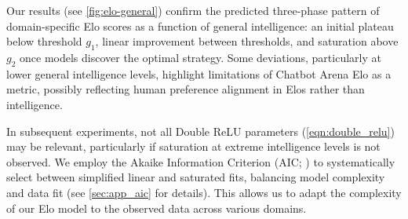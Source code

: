 \documentclass{article}
\begin{document}
Our results (see \cref{fig:elo-general}) confirm the predicted three-phase pattern of domain-specific Elo scores as a function of general intelligence: an initial plateau below threshold $g_1$, linear improvement between thresholds, and saturation above $g_2$ once models discover the optimal strategy. Some deviations, particularly at lower general intelligence levels, highlight limitations of Chatbot Arena Elo as a metric, possibly reflecting human preference alignment in Elos rather than intelligence.

In subsequent experiments, not all Double ReLU parameters (\cref{eqn:double_relu}) may be relevant, particularly if saturation at extreme intelligence levels is not observed. We employ the Akaike Information Criterion (AIC; \citealp{cavanaugh2019akaike}) to systematically select between simplified linear and saturated fits, balancing model complexity and data fit (see \cref{sec:app_aic} for details). This allows us to adapt the complexity of our Elo model to the observed data across various domains.





\end{document}
